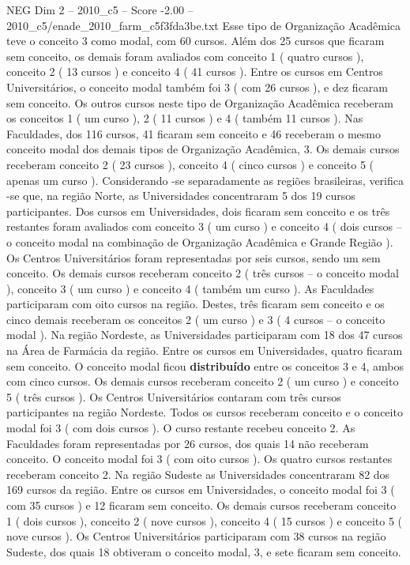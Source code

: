 \begin{textsample}{NEG Dim 2 – 2010\_c5 – Score -2.00 – 2010\_c5/enade\_2010\_farm\_c5f3fda3be.txt}
Esse tipo de Organização Acadêmica teve o conceito 3 como modal, com 60 cursos.
Além dos 25 cursos que ficaram sem conceito, os demais foram avaliados com conceito 1 ( quatro cursos ), conceito 2 ( 13 cursos ) e conceito 4 ( 41 cursos ).
Entre os cursos em Centros Universitários, o conceito modal também foi 3 ( com 26 cursos ), e dez ficaram sem conceito.
Os outros cursos neste tipo de Organização Acadêmica receberam os conceitos 1 ( um curso ), 2 ( 11 cursos ) e 4 ( também 11 cursos ).
Nas Faculdades, dos 116 cursos, 41 ficaram sem conceito e 46 receberam o mesmo conceito modal dos demais tipos de Organização Acadêmica, 3.
Os demais cursos receberam conceito 2 ( 23 cursos ), conceito 4 ( cinco cursos ) e conceito 5 ( apenas um curso ).
Considerando -se separadamente as regiões brasileiras, verifica -se que, na região Norte, as Universidades concentraram 5 dos 19 cursos participantes.
Dos cursos em Universidades, dois ficaram sem conceito e os três restantes foram avaliados com conceito 3 ( um curso ) e conceito 4 ( dois cursos – o conceito modal na combinação de Organização Acadêmica e Grande Região ).
Os Centros Universitários foram representadas por seis cursos, sendo um sem conceito.
Os demais cursos receberam conceito 2 ( três cursos – o conceito modal ), conceito 3 ( um curso ) e conceito 4 ( também um curso ).
As Faculdades participaram com oito cursos na região.
Destes, três ficaram sem conceito e os cinco demais receberam os conceitos 2 ( um curso ) e 3 ( 4 cursos – o conceito modal ).
Na região Nordeste, as Universidades participaram com 18 dos 47 cursos na Área de Farmácia da região.
Entre os cursos em Universidades, quatro ficaram sem conceito.
O conceito modal ficou \textbf{distribuído} entre os conceitos 3 e 4, ambos com cinco cursos.
Os demais cursos receberam conceito 2 ( um curso ) e conceito 5 ( três cursos ).
Os Centros Universitários contaram com três cursos participantes na região Nordeste.
Todos os cursos receberam conceito e o conceito modal foi 3 ( com dois cursos ).
O curso restante recebeu conceito 2.
As Faculdades foram representadas por 26 cursos, dos quais 14 não receberam conceito.
O conceito modal foi 3 ( com oito cursos ).
Os quatro cursos restantes receberam conceito 2.
Na região Sudeste as Universidades concentraram 82 dos 169 cursos da região.
Entre os cursos em Universidades, o conceito modal foi 3 ( com 35 cursos ) e 12 ficaram sem conceito.
Os demais cursos receberam conceito 1 ( dois cursos ), conceito 2 ( nove cursos ), conceito 4 ( 15 cursos ) e conceito 5 ( nove cursos ).
Os Centros Universitários participaram com 38 cursos na região Sudeste, dos quais 18 obtiveram o conceito modal, 3, e sete ficaram sem conceito.

\end{textsample}
